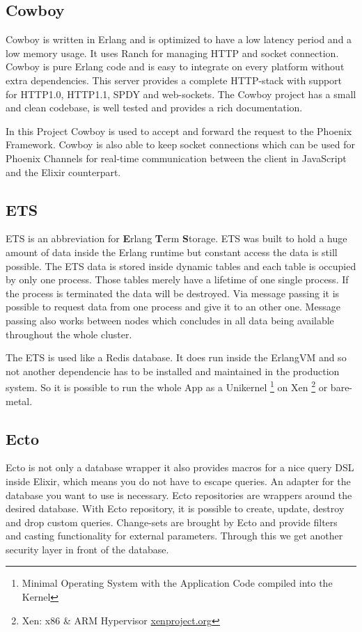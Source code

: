 \subsection{Cowboy}
Cowboy is written in Erlang and is optimized to have a low latency period and a low memory usage. It uses Ranch for managing HTTP and socket connection. Cowboy is pure Erlang code and is easy to integrate on every platform without extra dependencies. This server provides a complete HTTP-stack with support for HTTP1.0, HTTP1.1, SPDY and web-sockets. The Cowboy project has a small and clean codebase, is well tested and provides a rich documentation.

\textcolor{newcode}{In this Project Cowboy is used to accept and forward the request to the Phoenix Framework. Cowboy is also able to keep socket connections which can be used for Phoenix Channels for real-time communication between the client in JavaScript and the Elixir counterpart.}

\subsection{ETS}
ETS is an abbreviation for \textbf{E}rlang \textbf{T}erm \textbf{S}torage. ETS was built to hold a huge amount of data inside the Erlang runtime but constant access the data is still possible. The ETS data is stored inside dynamic tables and each table is occupied by only one process. Those tables merely have a lifetime of one single process. If the process is terminated the data will be destroyed. Via message passing it is possible to request data from one process and give it to an other one. Message passing also works between nodes which concludes in all data being available throughout the whole cluster. 

\textcolor{newcode}{The ETS is used like a Redis database. It does run inside the ErlangVM and so not another dependencie has to be installed  and maintained in the production system. So it is possible to run the whole App as a Unikernel  \footnote{Minimal Operating System with the Application Code compiled into the Kernel} on Xen \footnote{Xen: x86 \& ARM Hypervisor \url{xenproject.org}} or bare-metal.}

\subsection{Ecto}
Ecto is not only a database wrapper it also provides macros for a nice query DSL inside Elixir, which means you do not have to escape queries. An adapter for the database you want to use is necessary. Ecto repositories are wrappers around the desired database. With Ecto repository, it is possible to create, update, destroy and drop custom queries.  Change-sets are brought by Ecto and provide filters and casting functionality for external parameters. Through this we get another security layer in front of the database.

